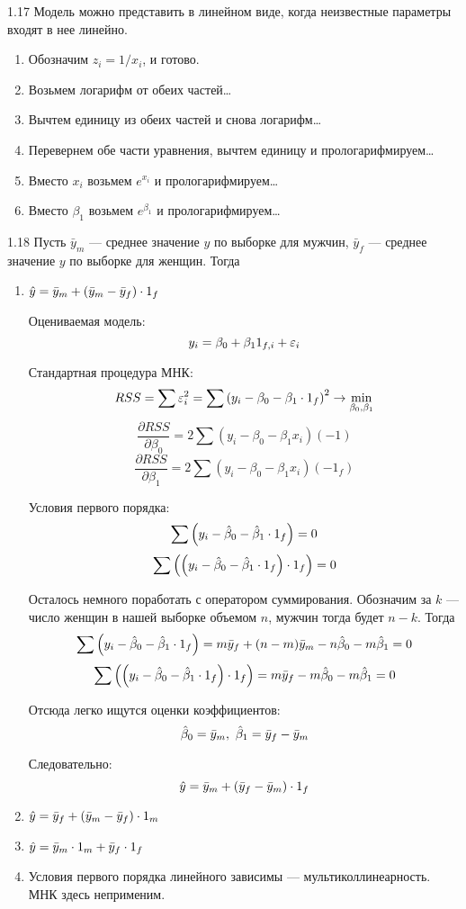 \protect \hypertarget {soln:1.17}{}
\begin{solution}{{1.17}}
Модель можно представить в линейном виде, когда неизвестные параметры входят в нее линейно.
\begin{enumerate}
\item Обозначим $z_i = 1/x_i$, и готово.
\item Возьмем логарифм от обеих частей\ldots
\item Вычтем единицу из обеих частей и снова логарифм\ldots
\item Перевернем обе части уравнения, вычтем единицу и прологарифмируем\ldots
\item Вместо $x_i$ возьмем $e^{x_i}$ и прологарифмируем\ldots
\item Вместо $\beta_1$ возьмем $e^{\beta_1}$ и прологарифмируем\ldots
\end{enumerate}
\end{solution}
\protect \hypertarget {soln:1.18}{}
\begin{solution}{{1.18}}
Пусть \(\bar{y}_m\) — среднее значение \(y\) по выборке для мужчин, \(\bar{y}_f\) — среднее значение \(y\) по выборке для женщин. Тогда

\begin{enumerate}
\item \(\hat{y} = \bar{y}_m + \left( \bar{y}_m -  \bar{y}_f \right) \cdot 1_f \)

Оцениваемая модель:
\[y_i = \beta_0 + \beta_1 1_{f, i} + \varepsilon_i \]

Стандартная процедура МНК:
\[RSS = \sum \varepsilon_i^2 = \sum \left(y_i - \beta_0 - \beta_1 \cdot 1_f \right)^2 \rightarrow \min \limits_{\beta_0, \beta_1}\]
\[\frac{\partial RSS}{\partial \beta_0} = 2 \sum \left(y_i - \beta_0 - \beta_1 x_i\right)(-1) \]
\[\frac{\partial RSS}{\partial \beta_1} = 2 \sum \left(y_i - \beta_0 - \beta_1 x_i\right)(-1_f) \]

Условия первого порядка:
\[\sum \left(y_i - \hat{\beta}_0 - \hat{\beta}_1 \cdot 1_f\right) = 0\]
\[\sum \left(\left(y_i - \hat{\beta}_0 - \hat{\beta}_1 \cdot 1_f\right)\cdot 1_f\right)= 0\]

Осталось немного поработать с оператором суммирования. Обозначим за \(k\) — число женщин в нашей выборке объемом \(n\), мужчин тогда будет \(n - k\). Тогда
\[\sum \left(y_i - \hat{\beta}_0 - \hat{\beta}_1 \cdot 1_f\right) = m \bar{y}_f + (n - m) \bar{y}_m - n \hat{\beta}_0 - m \hat{\beta}_1 = 0\]
\[\sum \left(\left(y_i - \hat{\beta}_0 - \hat{\beta}_1 \cdot 1_f\right)\cdot 1_f\right) = m    \bar{y}_f - m \hat{\beta}_0 - m \hat{\beta}_1 =0\]

Отсюда легко ищутся оценки коэффициентов:
\[\hat{\beta}_0 = \bar{y}_m, \ \hat{\beta}_1 = \bar{y}_f - \bar{y}_m  \]

Следовательно:
\[\hat{y} = \bar{y}_m + \left( \bar{y}_f -  \bar{y}_m \right) \cdot 1_f \]

\item \(\hat{y} = \bar{y}_f + \left( \bar{y}_m -  \bar{y}_f \right) \cdot 1_m \)

\item \(\hat{y} = \bar{y}_m \cdot 1_m + \bar{y}_f \cdot 1_f \)

\item Условия первого порядка линейного зависимы — мультиколлинеарность. МНК здесь неприменим.
\end{enumerate}
\end{solution}
